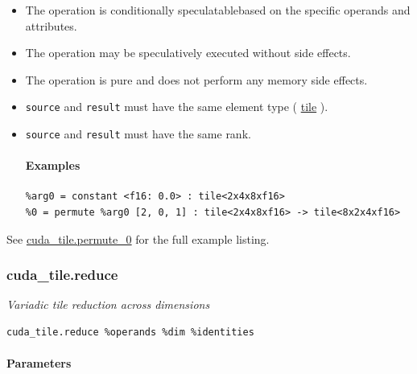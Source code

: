 \documentclass{article}
\begin{document}
\begin{itemize}
\item The operation is conditionally speculatablebased on the specific operands and attributes.
\item The operation may be speculatively executed without side effects.
\item The operation is pure and does not perform any memory side effects.
\item \texttt{source} and \texttt{result} must have the same element type ( \href{https://docs.nvidia.com/cuda/tile-ir/latest/sections/types.html#type-tile}{tile} ).
\item \texttt{source} and \texttt{result} must have the same rank.


\paragraph{Examples}

\begin{lstlisting}
%arg0 = constant <f16: 0.0> : tile<2x4x8xf16>
%0 = permute %arg0 [2, 0, 1] : tile<2x4x8xf16> -> tile<8x2x4xf16>
\end{lstlisting}

\end{itemize}
See \href{https://docs.nvidia.com/cuda/tile-ir/latest/sections/appendix.html#example-cuda-tile-permute-0}{cuda\_tile.permute\_0} for the full example listing.



\subsubsection{cuda\_tile.reduce}

\textit{Variadic tile reduction across dimensions}


\begin{lstlisting}
cuda_tile.reduce %operands %dim %identities
\end{lstlisting}

\paragraph{Parameters}
\end{document}
